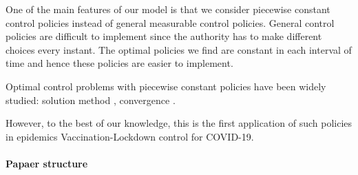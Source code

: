 One of the main features of our model is that we consider piecewise constant
control policies instead of general measurable control policies. General
control policies are difficult to implement since the authority has to make
different choices every instant. The optimal policies we find are constant in
each interval of time and hence these policies are easier to implement.

Optimal control problems with piecewise constant policies have been widely studied:  solution method \cite{MR3228405}, convergence \cite{MR3627992}.

However, to the best of our knowledge, this is the first application of such
policies in epidemics Vaccination-Lockdown control for COVID-19.

\paragraph{Papaer structure}